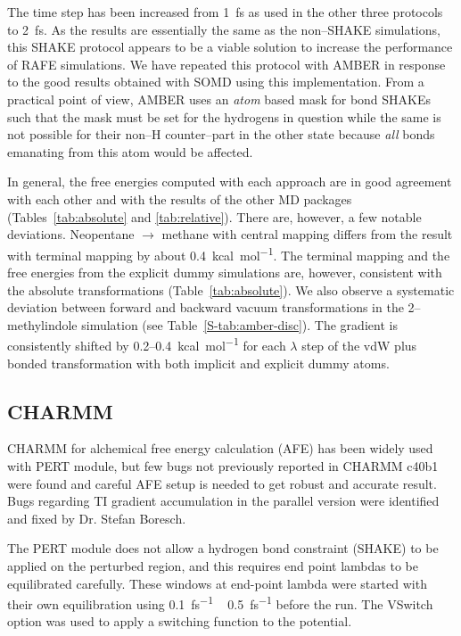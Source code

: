 \documentclass[journal=jctcce,manuscript=article]{achemso}
\begin{document}
The time step has been increased from \SI{1}{fs} as used in the other 
three protocols to \SI{2}{fs}.  As the results are essentially the same as the 
non--SHAKE simulations, this SHAKE protocol appears to be a viable solution to 
increase the performance of RAFE simulations.  We have repeated this protocol 
with AMBER in response to the good results obtained with SOMD using this 
implementation.  From a practical point of view, AMBER uses an \emph{atom} 
based mask for bond SHAKEs such that the mask must be set for the hydrogens in 
question while the same is not possible for their non--H counter--part in the 
other state because \emph{all} bonds emanating from this atom would be affected.

In general, the free energies computed with each approach are in good agreement 
with each other and with the results of the other MD packages 
(Tables~\ref{tab:absolute} and \ref{tab:relative}).  There are, however, a few 
notable deviations.  Neopentane $\rightarrow$ methane with central mapping 
differs from the result with terminal mapping by about 
\SI{0.4}{kcal.mol^{-1}}.  The terminal mapping and the free energies from the 
explicit dummy simulations are, however, consistent with the absolute 
transformations (Table~\ref{tab:absolute}).  We also observe a systematic 
deviation between forward and backward vacuum transformations in the 
2--methylindole simulation (see Table~\ref{S-tab:amber-disc}).  The gradient 
is consistently shifted by 0.2--\SI{0.4}{kcal.mol^{-1}} for each $\lambda$ step 
of the vdW plus bonded transformation with both implicit and explicit dummy 
atoms.


\subsection{CHARMM}
\label{sec:charmm-results}

CHARMM for alchemical free energy calculation (AFE) has been widely used with PERT module, but few bugs not previously reported in CHARMM c40b1 were found and careful AFE setup is needed to get robust and accurate result. Bugs regarding TI gradient accumulation in the parallel version were identified and fixed by Dr. Stefan Boresch.

The PERT module does not allow a hydrogen bond constraint (SHAKE) to be applied on the perturbed region, and this requires end point lambdas to be equilibrated
carefully. These windows at end-point lambda were started with their own equilibration using \SI{0.1}{fs^{-1}} ~ \SI{0.5}{fs^{-1}} before the run. The VSwitch option was used to apply a switching function to the potential.
\end{document}

